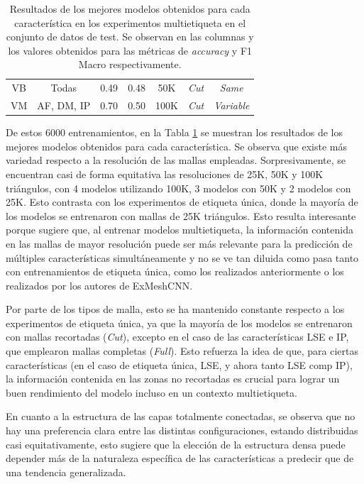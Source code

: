 \begin{table}[h]
{\begin{tabular}{|cc|c|c|c|c|c|}
        \multicolumn{1}{|c|}{VB} & Todas & 0.49 & 0.48 & 50K & \textit{Cut} & \textit{Same} \\
        \multicolumn{1}{|c|}{VM} & AF, DM, IP & 0.70 & 0.50 & 100K & \textit{Cut} & \textit{Variable} \\ \hline
    \end{tabular}%
    }
    \caption[Resultados de los mejores modelos obtenidos para cada característica en los experimentos multietiqueta]{Resultados de los mejores modelos obtenidos para cada característica en los experimentos multietiqueta en el conjunto de datos de test. Se observan en las columnas  y  los valores obtenidos para las métricas de \textit{accuracy} y F1 Macro respectivamente.}
    \label{table5:multilabel_results}
    \end{table}

De estos 6000 entrenamientos, en la Tabla \ref{table5:multilabel_results} se muestran los resultados de los mejores modelos obtenidos para cada característica. Se observa que existe más variedad respecto a la resolución de las mallas empleadas. Sorpresivamente, se encuentran casi de forma equitativa las resoluciones de 25K, 50K y 100K triángulos, con 4 modelos utilizando 100K, 3 modelos con 50K y 2 modelos con 25K. Esto contrasta con los experimentos de etiqueta única, donde la mayoría de los modelos se entrenaron con mallas de 25K triángulos. Esto resulta interesante porque sugiere que, al entrenar modelos multietiqueta, la información contenida en las mallas de mayor resolución puede ser más relevante para la predicción de múltiples características simultáneamente y no se ve tan diluida como pasa tanto con entrenamientos de etiqueta única, como los realizados anteriormente o los realizados por los autores de ExMeshCNN.

Por parte de los tipos de malla, esto se ha mantenido constante respecto a los experimentos de etiqueta única, ya que la mayoría de los modelos se entrenaron con mallas recortadas (\textit{Cut}), excepto en el caso de las características LSE e IP, que emplearon mallas completas (\textit{Full}). Esto refuerza la idea de que, para ciertas características (en el caso de etiqueta única, LSE, y ahora tanto LSE comp IP), la información contenida en las zonas no recortadas es crucial para lograr un buen rendimiento del modelo incluso en un contexto multietiqueta.

En cuanto a la estructura de las capas totalmente conectadas, se observa que no hay una preferencia clara entre las distintas configuraciones, estando distribuidas casi equitativamente, esto sugiere que la elección de la estructura densa puede depender más de la naturaleza específica de las características a predecir que de una tendencia generalizada.

